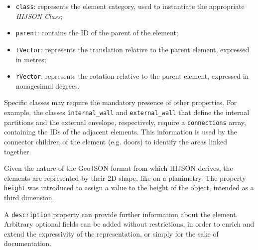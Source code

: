 \begin{itemize}
\itemsep1pt\parskip0pt
\item
 {\tt class}: represents the element category, used to instantiate
 the appropriate \emph{HIJSON Class};
\item
 {\tt parent}: contains the ID of the parent of the element;
\item
 {\tt tVector}: represents the translation relative to 
 the parent element, expressed in metres;
\item
 {\tt rVector}: represents the rotation relative to 
 the parent element, expressed in nonagesimal degrees.
\end{itemize}

Specific classes may require the mandatory presence of other properties. For
example, the classes {\tt internal\_wall} and {\tt external\_wall} that
define the internal partitions and the external envelope, respectively, require a {\tt connections}
array, containing the IDs of the adjacent elements. This information is used
by the connector children of the element (e.g. doors) to identify the
areas linked together.

Given the nature of the GeoJSON format from which HIJSON derives, the elements
are represented by their 2D shape, like on a planimetry. The property {\tt
height} was introduced to assign a value to the height of the object, intended
as a third dimension.

A {\tt description} property can provide further information about
the element.
Arbitrary optional fields can be added without restrictions, in order to
enrich and extend the expressivity of the representation, or simply for the sake of 
documentation.
